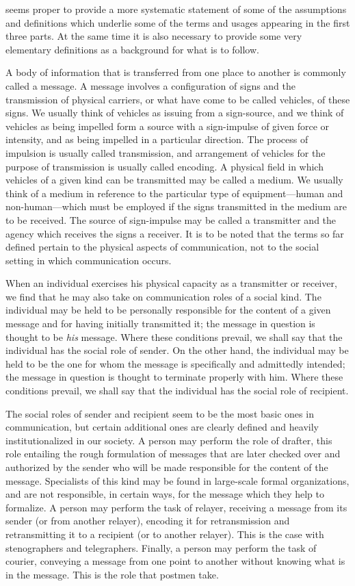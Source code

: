 \documentclass[twoside,symmetric,nobib,justified]{tufte-book}
\begin{document}
 seems proper to provide a more systematic statement of
some of the assumptions and definitions which underlie some of the terms
and usages appearing in the first three parts. At the same time it is
also necessary to provide some very elementary definitions as a
background for what is to follow.

A body of information that is transferred from one place to another is
commonly called a message. A message involves a configuration of signs
and the transmission of physical carriers, or what have come to be
called vehicles, of these signs. We usually think of vehicles as issuing
from a sign-source, and we think of vehicles as being impelled form a
source with a sign-impulse of given force or intensity, and as being
impelled in a particular direction. The process of impulsion is usually
called transmission, and arrangement of vehicles for the purpose of
transmission is usually called encoding. A physical field in which
vehicles of a given kind can be transmitted may be called a medium. We
usually think of a medium in reference to the particular type of
equipment---human and non-human---which must be employed if the signs
transmitted in the medium are to be received. The source of sign-impulse
may be called a transmitter and the agency which receives the signs a
receiver. It is to be noted that the terms so far defined pertain to the
physical aspects of communication, not to the social setting in which
communication occurs.

When an individual exercises his physical capacity as a transmitter or
receiver, we find that he may also take on communication roles of a
social kind. The individual may be held to be personally responsible for
the content of a given message and for having initially transmitted it;
the message in question is thought to be \emph{his} message. Where these
conditions prevail, we shall say that the individual has the social role
of sender. On the other hand, the individual may be held to be the one
for whom the message is specifically and admittedly intended; the
message in question is thought to terminate properly with him. Where
these conditions prevail, we shall say that the individual has the
social role of recipient.

The social roles of sender and recipient seem to be the most basic ones
in communication, but certain additional ones are clearly defined and
heavily institutionalized in our society. A person may perform the role
of drafter, this role entailing the rough formulation of messages that
are later checked over and authorized by the sender who will be made
responsible for the content of the message. Specialists of this kind may
be found in large-scale formal organizations, and are not responsible,
in certain ways, for the message which they help to formalize. A person
may perform the task of relayer, receiving a message from its sender (or
from another relayer), encoding it for retransmission and retransmitting
it to a recipient (or to another relayer). This is the case with
stenographers and telegraphers. Finally, a person may perform the task
of courier, conveying a message from one point to another without
knowing what is in the message. This is the role that postmen take.
\end{document}
